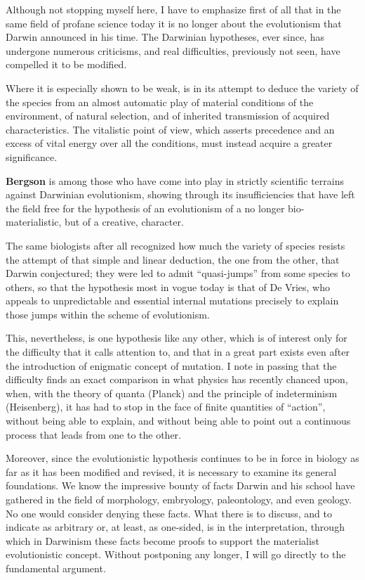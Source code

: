 Although not stopping myself here, I have to emphasize first of all that in the same field of profane science today it is no longer about the evolutionism that Darwin announced in his time. The Darwinian hypotheses, ever since, has undergone numerous criticisms, and real difficulties, previously not seen, have compelled it to be modified.

Where it is especially shown to be weak, is in its attempt to deduce the variety of the species from an almost automatic play of material conditions of the environment, of natural selection, and of inherited transmission of acquired characteristics. The vitalistic point of view, which asserts precedence and an excess of vital energy over all the conditions, must instead acquire a greater significance.

\textbf{Bergson} is among those who have come into play in strictly scientific terrains against Darwinian evolutionism, showing through its insufficiencies that have left the field free for the hypothesis of an evolutionism of a no longer bio-materialistic, but of a creative, character.

The same biologists after all recognized how much the variety of species resists the attempt of that simple and linear deduction, the one from the other, that Darwin conjectured; they were led to admit ``quasi-jumps'' from some species to others, so that the hypothesis most in vogue today is that of De Vries, who appeals to unpredictable and essential internal mutations precisely to explain those jumps within the scheme of evolutionism.

This, nevertheless, is one hypothesis like any other, which is of interest only for the difficulty that it calls attention to, and that in a great part exists even after the introduction of enigmatic concept of mutation. I note in passing that the difficulty finds an exact comparison in what physics has recently chanced upon, when, with the theory of quanta (Planck) and the principle of indeterminism (Heisenberg), it has had to stop in the face of finite quantities of ``action'', without being able to explain, and without being able to point out a continuous process that leads from one to the other.

Moreover, since the evolutionistic hypothesis continues to be in force in biology as far as it has been modified and revised, it is necessary to examine its general foundations. We know the impressive bounty of facts Darwin and his school have gathered in the field of morphology, embryology, paleontology, and even geology. No one would consider denying these facts. What there is to discuss, and to indicate as arbitrary or, at least, as one-sided, is in the interpretation, through which in Darwinism these facts become proofs to support the materialist evolutionistic concept. Without postponing any longer, I will go directly to the fundamental argument.

